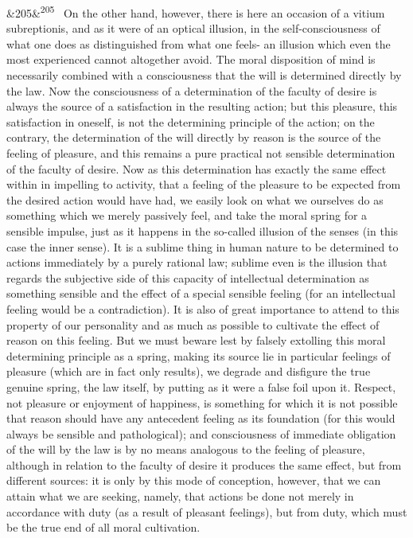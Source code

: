 \documentclass[12pt]{article}
\newcommand{\para}[1][]{\par\noindent\ifx&#1&\else\textsuperscript{\footnotesize #1}~\fi}
\begin{document}
\para[205] On the other hand, however, there is here an occasion of a vitium subreptionis, and as it were of an optical illusion, in the self-consciousness of what one does as distinguished from what one feels- an illusion which even the most experienced cannot altogether avoid. The moral disposition of mind is necessarily combined with a consciousness that the will is determined directly by the law. Now the consciousness of a determination of the faculty of desire is always the source of a satisfaction in the resulting action; but this pleasure, this satisfaction in oneself, is not the determining principle of the action; on the contrary, the determination of the will directly by reason is the source of the feeling of pleasure, and this remains a pure practical not sensible determination of the faculty of desire. Now as this determination has exactly the same effect within in impelling to activity, that a feeling of the pleasure to be expected from the desired action would have had, we easily look on what we ourselves do as something which we merely passively feel, and take the moral spring for a sensible impulse, just as it happens in the so-called illusion of the senses (in this case the inner sense). It is a sublime thing in human nature to be determined to actions immediately by a purely rational law; sublime even is the illusion that regards the subjective side of this capacity of intellectual determination as something sensible and the effect of a special sensible feeling (for an intellectual feeling would be a contradiction). It is also of great importance to attend to this property of our personality and as much as possible to cultivate the effect of reason on this feeling. But we must beware lest by falsely extolling this moral determining principle as a spring, making its source lie in particular feelings of pleasure (which are in fact only results), we degrade and disfigure the true genuine spring, the law itself, by putting as it were a false foil upon it. Respect, not pleasure or enjoyment of happiness, is something for which it is not possible that reason should have any antecedent feeling as its foundation (for this would always be sensible and pathological); and consciousness of immediate obligation of the will by the law is by no means analogous to the feeling of pleasure, although in relation to the faculty of desire it produces the same effect, but from different sources: it is only by this mode of conception, however, that we can attain what we are seeking, namely, that actions be done not merely in accordance with duty (as a result of pleasant feelings), but from duty, which must be the true end of all moral cultivation.
\end{document}
